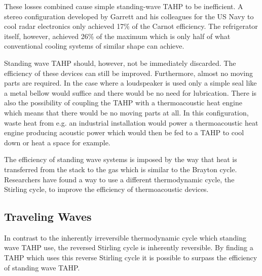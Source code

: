 \documentclass{article}
\begin{document}
These losses combined cause simple standing-wave TAHP to be inefficient. A stereo configuration developed by Garrett\cite{powerofsound} and his colleagues for the US Navy to cool radar electronics only achieved 17\% of the Carnot efficiency. The refrigerator itself, however, achieved 26\% of the maximum which is only half of what conventional cooling systems of similar shape can achieve. %

Standing wave TAHP should, however, not be immediately discarded. The efficiency of these devices can still be improved. Furthermore, almost no moving parts are required. In the case where a loudspeaker is used only a simple seal like a metal bellow would suffice and there would be no need for lubrication. There is also the possibility of coupling the TAHP with a thermoacoustic heat engine which means that there would be no moving parts at all. In this configuration, waste heat from e.g. an industrial installation would power a thermoacoustic heat engine producing acoustic power which would then be fed to a TAHP to cool down or heat a space for example.

The efficiency of standing wave systems is imposed by the way that heat is transferred from the stack to the gas which is similar to the Brayton cycle. Researchers have found a way to use a different thermodynamic cycle, the Stirling cycle, to improve the efficiency of thermoacoustic devices.\cite{ceperleyStirling}


\subsection{Traveling Waves\cite{spoelstraHighTemperature,BackHauseDetailedStudy,powerofsound,weiTravellingwave}}
In contrast to the inherently irreversible thermodynamic cycle which standing wave TAHP use, the reversed Stirling cycle is inherently reversible. By finding a TAHP which uses this reverse Stirling cycle it is possible to surpass the efficiency of standing wave TAHP.\@
\end{document}
